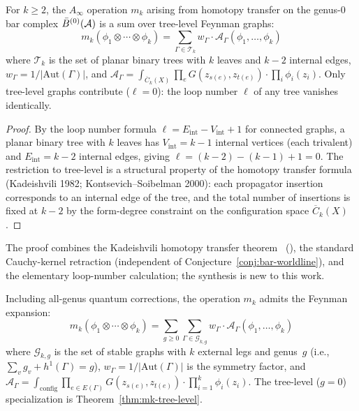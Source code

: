 \begin{theorem}
\label{thm:mk-tree-level}
For $k \geq 2$, the $A_\infty$ operation $m_k$ arising from
homotopy transfer on the genus-$0$ bar complex $\bar{B}^{(0)}(\mathcal{A})$
is a sum over tree-level Feynman graphs:
\[
m_k(\phi_1 \otimes \cdots \otimes \phi_k) =
\sum_{\Gamma \in \mathcal{T}_k} w_\Gamma \cdot \mathcal{A}_\Gamma(\phi_1,\ldots,\phi_k)
\]
where $\mathcal{T}_k$ is the set of planar binary trees with $k$ leaves
and $k-2$ internal edges, $w_\Gamma = 1/|\mathrm{Aut}(\Gamma)|$,
and $\mathcal{A}_\Gamma = \int_{\overline{C}_k(X)} \prod_{e} G(z_{s(e)}, z_{t(e)})
\cdot \prod_i \phi_i(z_i)$.
Only tree-level graphs contribute ($\ell = 0$): the loop number $\ell$ of any
tree vanishes identically.
\end{theorem}

\begin{proof}
By the loop number formula $\ell = E_{\mathrm{int}} - V_{\mathrm{int}} + 1$
for connected graphs, a planar binary tree with $k$ leaves has
$V_{\mathrm{int}} = k-1$ internal vertices (each trivalent) and
$E_{\mathrm{int}} = k-2$ internal edges, giving
$\ell = (k-2) - (k-1) + 1 = 0$.
The restriction to tree-level is a structural property of the
homotopy transfer formula (Kadeishvili 1982;
Kontsevich--Soibelman 2000): each propagator insertion
corresponds to an internal edge of the tree, and the total number of
insertions is fixed at $k-2$ by the form-degree constraint on the
configuration space $\overline{C}_{k}(X)$.
\end{proof}

\begin{remark}[Scope]
The proof combines the Kadeishvili homotopy transfer theorem~\cite{Kadeishvili80} (\ClaimStatusProvedElsewhere), the standard Cauchy-kernel retraction (independent of Conjecture~\ref{conj:bar-worldline}), and the elementary loop-number calculation; the synthesis is new to this work.
\end{remark}

\begin{theorem}
\label{thm:mk-general-structure}
Including all-genus quantum corrections, the operation $m_k$ admits
the Feynman expansion:
\[
m_k(\phi_1 \otimes \cdots \otimes \phi_k) = \sum_{g \geq 0}
\sum_{\Gamma \in \mathcal{G}_{k,g}} w_\Gamma \cdot \mathcal{A}_\Gamma(\phi_1,\ldots,\phi_k)
\]
where $\mathcal{G}_{k,g}$ is the set of stable graphs with $k$
external legs and genus~$g$ (i.e., $\sum_{v} g_v + h^1(\Gamma) = g$),
$w_\Gamma = 1/|\mathrm{Aut}(\Gamma)|$ is the symmetry factor, and
$\mathcal{A}_\Gamma = \int_{\mathrm{config}} \prod_{e \in E(\Gamma)}
G(z_{s(e)}, z_{t(e)}) \cdot \prod_{i=1}^k \phi_i(z_i)$.
The tree-level ($g = 0$) specialization is
Theorem~\textup{\ref{thm:mk-tree-level}}.
\end{theorem}

